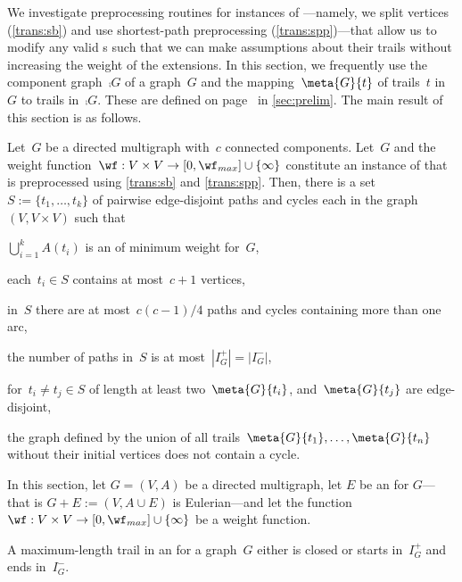 We investigate preprocessing routines for instances of \pWMEEs{}---namely, we split vertices (\autoref{trans:sb}) and use shortest-path preprocessing (\autoref{trans:spp})---that allow us to modify any valid \EE s such that we can make assumptions about their trails without increasing the weight of the extensions. In this section, we frequently use the component graph~$\comp{G}$ of a graph~$G$ and the mapping~$\meta{G}{t}$ of trails~$t$ in~$G$ to trails in~$\comp{G}$. These are defined on page~\pageref{def:meta} in \autoref{sec:prelim}. The main result of this section is as follows.
\newcommand{\eestructuretheorem}{Let~$G$ be a directed multigraph with~$c$ connected components. Let~$G$ and the weight function~$\wf: V \times V \rightarrow [0, \wf_{max}]\cup \{\infty\}$ constitute an instance of \pWMEE{} that is preprocessed using \autoref{trans:sb} and \autoref{trans:spp}. Then, there is a set~$S := \{t_1, \ldots, t_k\}$ of pairwise edge-disjoint paths and cycles each in the graph~$(V, V \times V)$ such that
  \begin{lemenum}
  \item $\bigcup_{i=1}^kA(t_i)$ is an \EE{} of minimum weight for~$G$,\label{enu:ees5}
\item each~$t_i \in S$ contains at most~$c+1$ vertices,\label{enu:ees2}
  \item in~$S$ there are at most~$c(c-1)/4$ paths and cycles containing more than one arc,\label{enu:ees3}
  \item the number of paths in~$S$ is at most~$|I_G^+| = |I_G^-|$,\label{enu:ees4}
  \item for~$t_i \neq t_j \in S$ of length at least two~$\meta{G}{t_i}$, and~$\meta{G}{t_j}$ are edge-disjoint,\label{enu:ees7}
  \item the graph defined by the union of all trails~$\meta{G}{t_1}, \ldots, \meta{G}{t_n}$ without their initial vertices does not contain a cycle. \label{enu:ees6}
  \end{lemenum}
}
\begin{theorem}\label{the:eestructure}
  \eestructuretheorem
\end{theorem}
In this section, let $G=(V,A)$ be a directed multigraph, let $E$ be an \EE{} for $G$---that is $G + E :=(V, A \cup E)$ is Eulerian---and let the function~$\wf: V \times V \rightarrow [0, \wf_{max}]\cup \{\infty\} $ be a weight function.
\begin{observation}
  \label{obs:walkdichotomy}
  A maximum-length trail in an \EE{} for a graph~$G$ either is closed or starts in~$I^+_G$ and ends in~$I^-_G$.
\end{observation}
